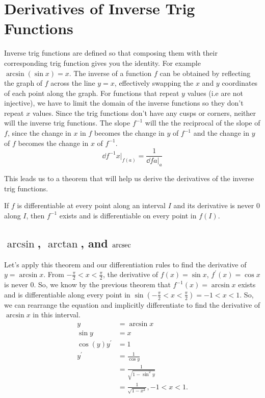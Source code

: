 \section{Derivatives of Inverse Trig Functions}
Inverse trig functions are defined so that composing them with their corresponding trig function gives you the identity.
For example $\arcsin{(\sin{x})} = x$.
The inverse of a function $f$ can be obtained by reflecting the graph of $f$ across the line $y=x$, effectively swapping the $x$ and $y$ coordinates of each point along the graph.
For functions that repeat $y$ values (i.e are not injective), we have to limit the domain of the inverse functions so they don't repeat $x$ values.
Since the trig functions don't have any cusps or corners, neither will the inverse trig functions.
The slope $f^{-1}$ will the the reciprocal of the slope of $f$, since the change in $x$ in $f$ becomes the change in $y$ of $f^{-1}$ and the change in $y$ of $f$ becomes the change in $x$ of $f^{-1}$.
\begin{equation*}
	\dd{f^{-1}}{x}\biggr\rvert_{f(a)} = \frac{1}{\dd{f}{a}\bigr\rvert_{a}}
\end{equation*}

\noindent
This leads us to a theorem that will help us derive the derivatives of the inverse trig functions.
\begin{theorem}
	If $f$ is differentiable at every point along an interval $I$ and its derivative is never 0 along $I$, then $f^{-1}$ exists and is differentiable on every point in $f(I)$.
\end{theorem}

\subsection{$\arcsin$, $\arctan$, and $\operatorname{arcsec}$}
Let's apply this theorem and our differentiation rules to find the derivative of $y = \arcsin{x}$.
From $-\frac{\pi}{2} < x < \frac{\pi}{2}$, the derivative of $f(x)=\sin{x}$, $f^\prime(x)=\cos{x}$ is never 0.
So, we know by the previous theorem that $f^{-1}(x)=\arcsin{x}$ exists and is differentiable along every point in $\sin(-\frac{\pi}{2} < x < \frac{\pi}{2}) = -1 < x < 1$.
So, we can rearrange the equation and implicitly differentiate to find the derivative of $\arcsin{x}$ in this interval.
\begin{align*}
	y &= \arcsin{x} \\
	\sin{y} &= x \\
	\cos{(y)}y^\prime &= 1 \\
	y^\prime &= \frac{1}{\cos{y}} \\
	&= \frac{1}{\sqrt{1-\sin^2{y}}} \\
	&= \frac{1}{\sqrt{1-x^2}}, -1 < x < 1.
\end{align*}

